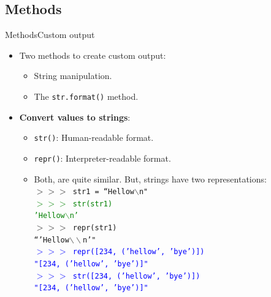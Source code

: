 \documentclass[10pt,compress]{beamer} %
\begin{document}
\subsection{Methods}
\begin{frame}{Methods}{Custom output}
	\begin{itemize}
		\item Two methods to create custom output:
			\begin{itemize}
			\item String manipulation.
			\item The \texttt{str.format()} method.
			\end{itemize}
		\item \textbf{Convert values to strings}:
			\begin{itemize}
			\item \texttt{str()}: Human-readable format.
			\item \texttt{repr()}: Interpreter-readable format.
			\item Both, are quite similar. But, strings have two representations:\\
			\footnotesize{\texttt{$>>>$ str1 = ``Hellow$\backslash$n"}}\\
			\textcolor{green}{\footnotesize{\texttt{$>>>$ str(str1)}}\\
			\footnotesize{\texttt{'Hellow$\backslash$n'}}}\\
			\alert{\footnotesize{\texttt{$>>>$ repr(str1)}}}\\
			\alert{\footnotesize{\texttt{``'Hellow$\backslash\backslash$n'"}}}\\
			\textcolor{blue}{\footnotesize{\texttt{$>>>$ repr([234, ('hellow', 'bye')])}}\\
			\footnotesize{\texttt{"[234, ('hellow', 'bye')]"}}\\
			\footnotesize{\texttt{$>>>$ str([234, ('hellow', 'bye')])}}\\
			\footnotesize{\texttt{"[234, ('hellow', 'bye')]"}}}\\	
			\end{itemize}
			
			
	\end{itemize}
\end{frame}
\end{document}
